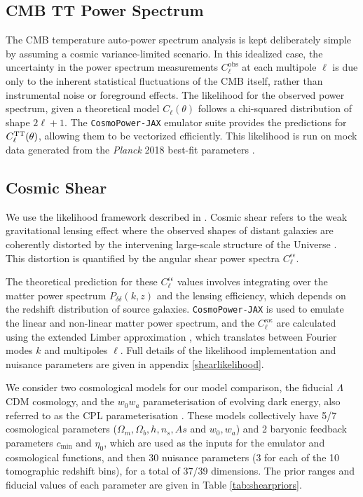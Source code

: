 \documentclass[twocolumn]{openjournal}
\begin{document}
\subsection{CMB TT Power Spectrum}
The CMB temperature auto-power spectrum analysis is kept deliberately simple by assuming a cosmic variance-limited scenario. In this idealized case, the uncertainty in the power spectrum measurements $C_\ell^{\text{obs}}$ at each multipole $\ell$ is due only to the inherent statistical fluctuations of the CMB itself, rather than instrumental noise or foreground effects. The likelihood for the observed power spectrum, given a theoretical model $C_\ell(\theta)$ follows a chi-squared distribution of shape $2\ell +1$. The \texttt{CosmoPower-JAX} emulator suite provides the predictions for $C^{\rm{TT}}_\ell(\theta)$, allowing them to be vectorized  efficiently. This likelihood is run on mock data generated from the \textit{Planck} 2018 best-fit parameters \citep{planck}.

\subsection{Cosmic Shear}
We use the likelihood framework described in \citet{Piras_2023,Piras_2024}. Cosmic shear refers to the weak gravitational lensing effect where the observed shapes of distant galaxies are coherently distorted by the intervening large-scale structure of the Universe \citep{Kilbinger_2015}. This distortion is quantified by the angular shear power spectra $C_\ell^{\epsilon \epsilon}$.

The theoretical prediction for these $C_\ell^{\epsilon\epsilon}$ values involves integrating over the matter power spectrum $P_{\delta\delta}(k,z)$ and the lensing efficiency, which depends on the redshift distribution of source galaxies. \texttt{CosmoPower-JAX} is used to emulate the linear and non-linear matter power spectrum, and the $C_\ell^{\kappa\kappa}$ are calculated using the extended Limber approximation \citep{LoVerde_2008}, which translates between Fourier modes $k$ and multipoles $\ell$. Full details of the likelihood implementation and nuisance parameters are given in appendix \ref{shearlikelihood}.

We consider two cosmological models for our model comparison, the fiducial $\Lambda$CDM cosmology, and the $w_0w_a$ parameterisation of evolving dark energy, also referred to as the CPL parameterisation \citep{CPL}. These models collectively have 5/7 cosmological parameters ($\Omega_m, \Omega_b, h, n_s, As$ and $w_0, w_a$) and 2 baryonic feedback parameters $c_\text{min}$ and $\eta_0$, which are used as the inputs for the emulator and cosmological functions, and then 30 nuisance parameters (3 for each of the 10 tomographic redshift bins), for a total of 37/39 dimensions. The prior ranges and fiducial values of each parameter are given in Table \ref{tab:shearpriors}.
\end{document}

